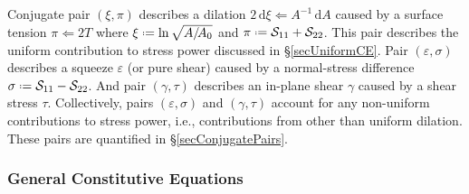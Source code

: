 Conjugate pair $( \xi , \pi )$ describes a dilation $2 \, \mathrm{d} \xi \Leftarrow A^{-1} \, \mathrm{d} A$ caused by a surface tension $\pi \Leftarrow 2T$ where $\xi \defeq \ln \sqrt{A / \! A_0}$ and $\pi \defeq \mathcal{S}_{11} + \mathcal{S}_{22}$.  This pair describes the uniform contribution to stress power discussed in \S\ref{secUniformCE}.  Pair $( \varepsilon , \sigma )$ describes a squeeze $\varepsilon$ (or pure shear) caused by a normal-stress difference $\sigma \defeq \mathcal{S}_{11} - \mathcal{S}_{22}$.  And pair $( \gamma , \tau )$ describes an in-plane shear $\gamma$ caused by a shear stress $\tau$. Collectively, pairs $( \varepsilon , \sigma )$ and $( \gamma , \tau )$ account for any non-uniform contributions to stress power, i.e., contributions from other than uniform dilation.  These pairs are quantified in \S\ref{secConjugatePairs}.

\subsubsection{General Constitutive Equations}

